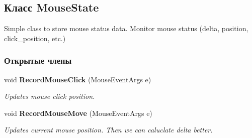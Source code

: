 \subsection{Класс Mouse\+State}
\label{class_win_form_animation2_d_1_1_mouse_state}


Simple class to store mouse status data. Monitor mouse status (delta, position, click\+\_\+position, etc.)  


\subsubsection*{Открытые члены}
\begin{DoxyCompactItemize}
\item 
void {\bf Record\+Mouse\+Click} (Mouse\+Event\+Args e)\label{class_win_form_animation2_d_1_1_mouse_state_a90501009d4cbf911a31d880523548f63}

\begin{DoxyCompactList}\small\item\em Updates mouse click position. \end{DoxyCompactList}\item 
void {\bf Record\+Mouse\+Move} (Mouse\+Event\+Args e)\label{class_win_form_animation2_d_1_1_mouse_state_afa4a1b4f3fc39ff61fd13d7ba3e5d628}

\begin{DoxyCompactList}\small\item\em Updates current mouse position. Then we can caluclate delta better. \end{DoxyCompactList}\end{DoxyCompactItemize}
